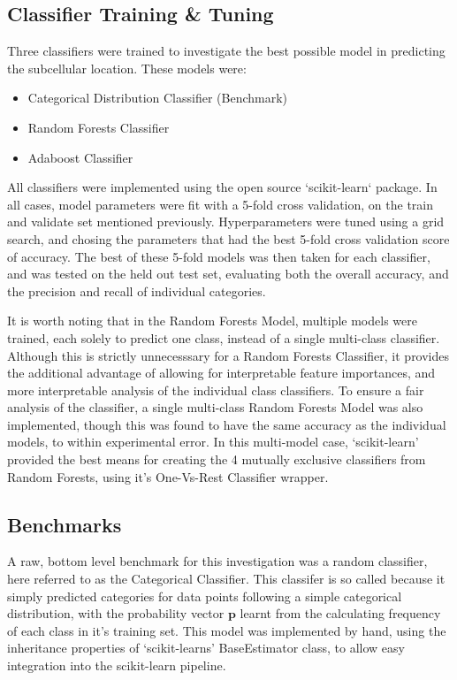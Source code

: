 \documentclass{bioinfo}
\begin{document}
\subsection{Classifier Training \& Tuning}

Three classifiers were trained to investigate the best possible model in predicting the subcellular location. These models were:

\begin{itemize}
  \item {Categorical Distribution Classifier (Benchmark)}
  \item {Random Forests Classifier}
  \item {Adaboost Classifier}
\end{itemize}

All classifiers were implemented using the open source `scikit-learn` package. In all cases, model parameters were fit with a 5-fold cross validation, on the train and validate set mentioned previously. 
Hyperparameters were tuned using a grid search, and chosing the parameters that had the best 5-fold cross validation score of accuracy. 
The best of these 5-fold models was then taken for each classifier, and was tested on the held out test set, evaluating both the overall accuracy, and the precision and recall of individual categories.

It is worth noting that in the Random Forests Model, multiple models were trained, each solely to predict one class, instead of a single multi-class classifier. 
Although this is strictly unnecesssary for a Random Forests Classifier, it provides the additional advantage of allowing for interpretable feature importances, and more interpretable analysis of the individual class classifiers. 
To ensure a fair analysis of the classifier, a single multi-class Random Forests Model was also implemented, though this was found to have the same accuracy as the individual models, to within experimental error.
In this multi-model case, `scikit-learn' provided the best means for creating the 4 mutually exclusive classifiers from Random Forests, using it's One-Vs-Rest Classifier wrapper.

\subsection{Benchmarks}

A raw, bottom level benchmark for this investigation was a random classifier, here referred to as the Categorical Classifier. 
This classifer is so called because it simply predicted categories for data points following a simple categorical distribution, with the probability vector $\mathbf{p}$ learnt from the calculating frequency of each class in it's training set.
This model was implemented by hand, using the inheritance properties of `scikit-learns' BaseEstimator class, to allow easy integration into the scikit-learn pipeline.
\end{document}
